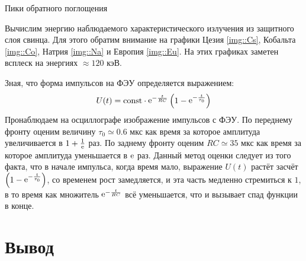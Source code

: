 \begin{table}[h!]
  \centering
  \caption{Пики обратного поглощения}
  
\end{table}

Вычислим энергию наблюдаемого характеристического излучения из защитного слоя
свинца. Для этого обратим внимание на графики Цезия \ref{img::Cs}, Кобальта
\ref{img::Co}, Натрия \ref{img::Na} и Европия \ref{img::Eu}.
На этих графиках заметен всплеск на энергиях $\approx 120$ кэВ.

Зная, что форма импульсов на ФЭУ определяется выражением:
\[
  U(t) = \text{const} \cdot \mathop{\mathrm e}\nolimits^{-\frac{t}{RC}}
  \left(1 - \mathop{\mathrm e}\nolimits^{ - \frac{t}{\tau_0}}\right)
\]
Пронаблюдаем на осциллографе изображение импульсов с ФЭУ. По переднему фронту
оценим величину $\tau_0 \simeq 0.6$ мкс как время за которое амплитуда
увеличивается в $1 + \frac{1}{\mathop{\mathrm e}\nolimits}$ раз. По заднему фронту оценим $RC \simeq 35$ мкс как время
за которое амплитуда уменьшается в $\mathop{\mathrm e}\nolimits$ раз.
Данный метод оценки следует из того факта, что в начале импульса,
когда время мало, выражение $U(t)$ растёт засчёт $\left(1 - \mathop{\mathrm e}\nolimits^{ - \frac{t}{\tau_0}}\right)$,
со временем рост замедляется, и эта часть медленно стремиться к $1$, в то время как множитель
$\mathop{\mathrm e}\nolimits^{-\frac{t}{RC}}$ всё уменьшается, что и вызывает спад функции в конце.

\section{Вывод}

